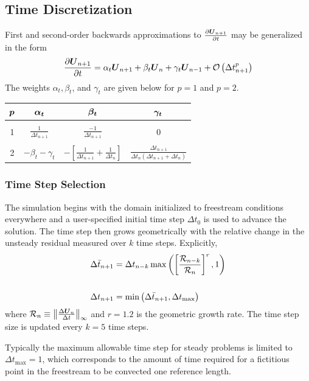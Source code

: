 \documentclass[compress,11pt]{beamer}
\begin{document}
\subsection{Time Discretization}
\frame
{
  \vspace{-.5em}
  \scriptsize  
  First and second-order backwards approximations to ${\frac{\partial{{\boldsymbol{U}}_{n+1}}}{\partial{t}}}$ may be  generalized in the form
  \begin{equation}
    {\frac{\partial{{\boldsymbol{U}}_{n+1}}}{\partial{t}}} = \alpha_t {\boldsymbol{U}}_{n+1} + \beta_t {\boldsymbol{U}}_n + \gamma_t {\boldsymbol{U}}_{n-1} + \mathcal{O}\left(\Delta t_{n+1}^p\right)
    \label{eq:udot_thee_pt_backward}
  \end{equation}
The weights $\alpha_t, \beta_t$, and $\gamma_t$ are given below for $p=1$ and $p=2$.

  \normalsize
  \begin{center}
    \begin{tabular}{c||ccc}
      ${\boldsymbol{p}}$ & ${\boldsymbol{\alpha_t}}$ & ${\boldsymbol{\beta_t}}$ & ${\boldsymbol{\gamma_t}}$ \\ \hline\hline
          &          &         & \\
       1  & $\frac{1}{\Delta t_{n+1}}$ & $\frac{-1}{\Delta t_{n+1}}$ & 0 \\
          &          &         & \\
       2  & $-\beta_t - \gamma_t$ %
          & $-\left[\frac{1}{\Delta t_{n+1}} + \frac{1}{\Delta t_n}\right]$
          & $\frac{\Delta t_{n+1}}{\Delta t_n\left(\Delta t_{n+1} + \Delta t_n\right)}$ 
    \end{tabular}
  \end{center}
}

\frame
{
  \frametitle{\scriptsize Time Step Selection}
  \vspace{-1em}
  \footnotesize
  The simulation begins with the domain initialized to freestream conditions everywhere and a user-specified initial time step $\Delta t_0$ is used to advance the solution.  The time step then grows geometrically with the relative change in the unsteady residual measured over $k$ time steps.  Explicitly, 
\begin{align}
  \Delta \bar{t}_{n+1} &= \Delta t_{n-k} \max\left(\left[\frac{\mathcal{R}_{n-k}}{\mathcal{R}_{n}}\right]^r,1\right) \label{geometric_timestep_growth} \\ \vspace{1em}
                 & \nonumber \\
  \Delta t_{n+1} &= \min\left(\Delta \bar{t}_{n+1},\Delta t_{\text{max}}\right) \label{dt_limiting}
\end{align}
where $\mathcal{R}_{n} \equiv \left\|\frac{\Delta {\boldsymbol{U}}_n}{\Delta t}\right\|_{\infty}$ and $r=1.2$ is the geometric growth rate.  The time step size is updated every $k=5$ time steps.
\vspace{1em}

Typically the maximum allowable time step for steady problems is limited to $\Delta t_{\text{max}}=1$, which corresponds to the amount of time required for a fictitious point in the freestream to be convected one reference length.

}
\end{document}

